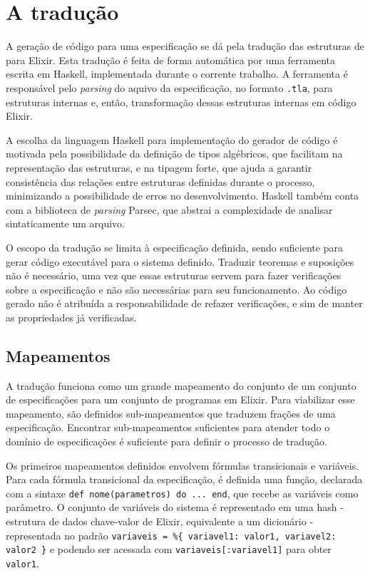 \section{A tradução}
\label{traducao}

A geração de código para uma especificação se dá pela tradução das estruturas de \TLA para Elixir. Esta tradução é feita de forma automática por uma ferramenta escrita em Haskell, implementada durante o corrente trabalho. A ferramenta é responsável pelo \textit{parsing} do aquivo da especificação, no formato \texttt{.tla}, para estruturas internas e, então, transformação dessas estruturas internas em código Elixir.

A escolha da linguagem Haskell para implementação do gerador de código é motivada pela possibilidade da definição de tipos algébricos, que facilitam na representação das estruturas, e na tipagem forte, que ajuda a garantir consistência das relações entre estruturas definidas durante o processo, minimizando a possibilidade de erros no desenvolvimento. Haskell também conta com a biblioteca de \textit{parsing} Parsec, que abstrai a complexidade de analisar sintaticamente um arquivo.

O escopo da tradução se limita à especificação definida, sendo suficiente para gerar código executável para o sistema definido. Traduzir teoremas e suposições não é necessário, uma vez que essas estruturas servem para fazer verificações sobre a especificação e não são necessárias para seu funcionamento. Ao código gerado não é atribuída a responsabilidade de refazer verificações, e sim de manter as propriedades já verificadas.

\subsection{Mapeamentos}
\label{mapeamentos}

A tradução funciona como um grande mapeamento do conjunto de um conjunto de especificações para um conjunto de programas em Elixir. Para viabilizar esse mapeamento, são definidos sub-mapeamentos que traduzem frações de uma especificação. Encontrar sub-mapeamentos suficientes para atender todo o domínio de especificações é suficiente para definir o processo de tradução.

Os primeiros mapeamentos definidos envolvem fórmulas transicionais e va\-ri\-á\-veis. Para cada fórmula transicional da especificação, é definida uma função, declarada com a sintaxe \texttt{def nome(parametros) do ... end}, que recebe as variáveis como parâmetro. O conjunto de variáveis do sistema é representado em uma hash - estrutura de dados chave-valor de Elixir, equivalente a um dicionário - representada no padrão \texttt{variaveis = \%\{ variavel1: valor1, variavel2: valor2 \}} e podendo ser acessada com \texttt{variaveis[:variavel1]} para obter \texttt{valor1}.

